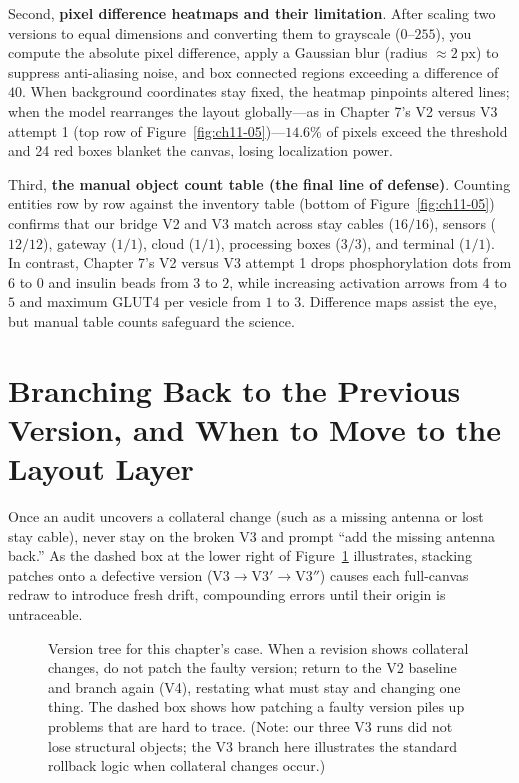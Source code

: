 Second, \textbf{pixel difference heatmaps and their limitation}. After scaling two versions to equal dimensions and converting them to grayscale ($0\text{--}255$), you compute the absolute pixel difference, apply a Gaussian blur (radius $\approx 2\ \text{px}$) to suppress anti-aliasing noise, and box connected regions exceeding a difference of $40$. When background coordinates stay fixed, the heatmap pinpoints altered lines; when the model rearranges the layout globally---as in Chapter 7's V2 versus V3 attempt 1 (top row of Figure~\ref{fig:ch11-05})---$14.6\%$ of pixels exceed the threshold and 24 red boxes blanket the canvas, losing localization power.

Third, \textbf{the manual object count table (the final line of defense)}. Counting entities row by row against the inventory table (bottom of Figure~\ref{fig:ch11-05}) confirms that our bridge V2 and V3 match across stay cables ($16/16$), sensors ($12/12$), gateway ($1/1$), cloud ($1/1$), processing boxes ($3/3$), and terminal ($1/1$). In contrast, Chapter 7's V2 versus V3 attempt 1 drops phosphorylation dots from $6$ to $0$ and insulin beads from $3$ to $2$, while increasing activation arrows from $4$ to $5$ and maximum GLUT4 per vesicle from $1$ to $3$. Difference maps assist the eye, but manual table counts safeguard the science.

\section{Branching Back to the Previous Version, and When to Move to the Layout Layer}

Once an audit uncovers a collateral change (such as a missing antenna or lost stay cable), never stay on the broken V3 and prompt ``add the missing antenna back.'' As the dashed box at the lower right of Figure~\ref{fig:ch11-08} illustrates, stacking patches onto a defective version ($\text{V3} \rightarrow \text{V3}' \rightarrow \text{V3}''$) causes each full-canvas redraw to introduce fresh drift, compounding errors until their origin is untraceable.

\begin{figure}[htbp]\centering
{}
\caption{Version tree for this chapter's case. When a revision shows collateral changes, do not patch the faulty version; return to the V2 baseline and branch again (V4), restating what must stay and changing one thing. The dashed box shows how patching a faulty version piles up problems that are hard to trace. (Note: our three V3 runs did not lose structural objects; the V3 branch here illustrates the standard rollback logic when collateral changes occur.)}\label{fig:ch11-08}
\end{figure}

